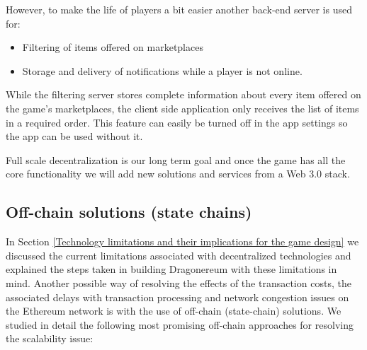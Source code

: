 \documentclass[12pt]{article}
\begin{document}
\begin{samepage}
However, to make the life of players a bit easier another back-end server is used for:\par

\begin{itemize}
	\item Filtering of items offered on marketplaces\par

	\item Storage and delivery of notifications while a player is not online.
\end{itemize}\par
\end{samepage}

While the filtering server stores complete information about every item offered on the game’s marketplaces, the client side application only receives the list of items in a required order. This feature can easily be turned off in the app settings so the app can be used without it.\par

Full scale decentralization is our long term goal and once the game has all the core functionality we will add new solutions and services from a Web 3.0 stack.




\vspace{\baselineskip}\subsection{Off-chain solutions (state chains)}
 \label{Off-chain solutions (state chains)} \par

In Section \ref{Technology limitations and their implications for the game design} we discussed the current limitations associated with decentralized technologies and explained the steps taken in building Dragonereum with these limitations in mind. Another possible way of resolving the effects of the transaction costs, the associated delays with transaction processing and network congestion issues on the Ethereum network is with the use of off-chain (state-chain) solutions. We studied in detail the following most promising off-chain approaches for resolving the scalability issue:\par
\end{document}
